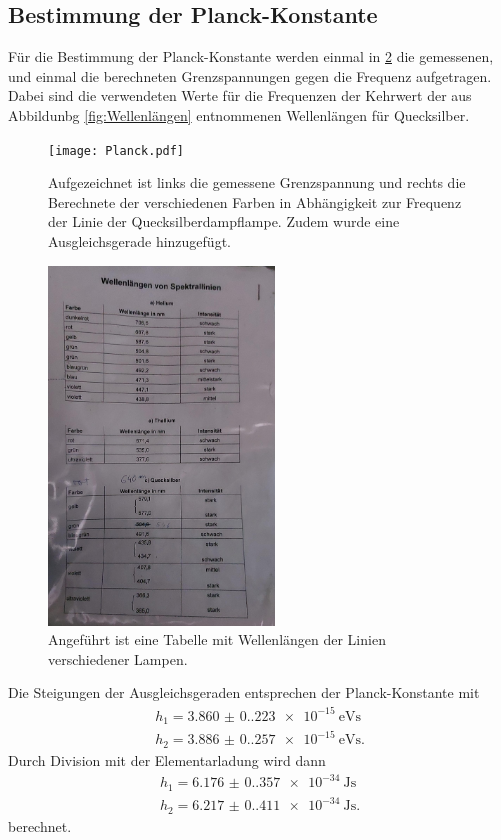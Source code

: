\subsection{Bestimmung der Planck-Konstante}
Für die Bestimmung der Planck-Konstante werden einmal in \ref{fig:Planck} die gemessenen, und einmal die berechneten Grenzspannungen gegen die Frequenz aufgetragen.
Dabei sind die verwendeten Werte für die Frequenzen der Kehrwert der aus Abbildunbg \ref{fig:Wellenlängen} entnommenen Wellenlängen für Quecksilber.

\begin{figure}[H]
  \centering
  \texttt{[image: Planck.pdf]}
  \caption{Aufgezeichnet ist links die gemessene Grenzspannung und rechts die Berechnete der verschiedenen Farben in Abhängigkeit zur Frequenz der Linie der Quecksilberdampflampe.
  Zudem wurde eine Ausgleichsgerade hinzugefügt.}
  \label{fig:Planck}
\end{figure}

\begin{figure}[H]
  \centering
  \includegraphics[width=6cm]{Bilder/Well.jpg}
  \caption{Angeführt ist eine Tabelle mit Wellenlängen der Linien verschiedener Lampen.}
  \label{fig:Planck}
\end{figure}

Die Steigungen der Ausgleichsgeraden entsprechen der Planck-Konstante mit
\begin{gather*}
h_1=\qty{3.860(0.223)e-15}{\electronvolt\second}\\
h_2=\qty{3.886(0.257)e-15}{\electronvolt\second}.
\end{gather*}
Durch Division mit der Elementarladung wird dann 
\begin{gather*}
  h_1=\qty{6.176(0.357)e-34}{\joule\second}\\
  h_2=\qty{6.217(0.411)e-34}{\joule\second}.
\end{gather*}
berechnet.



